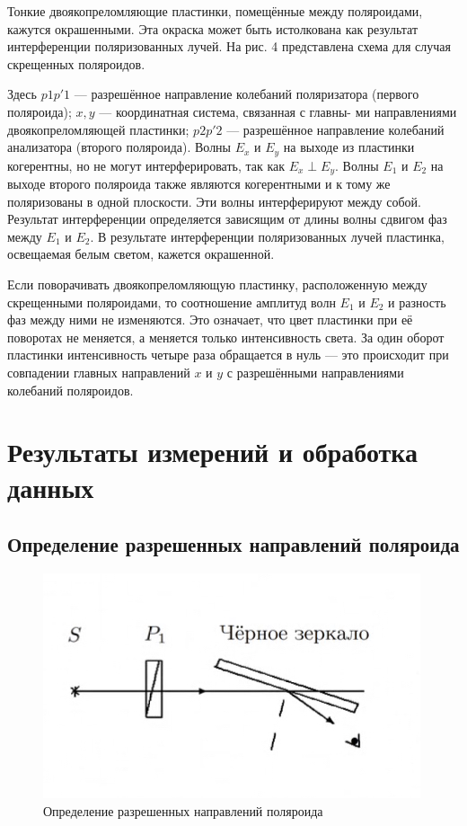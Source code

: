 \documentclass[a4paper,12pt]{article}
\begin{document}
Тонкие двоякопреломляющие пластинки, помещённые между поляроидами, кажутся окрашенными. Эта окраска может быть истолкована как результат интерференции поляризованных лучей. На рис. 4 представлена схема для
случая скрещенных поляроидов.

Здесь $ p1p'1 $ --- разрешённое направление колебаний поляризатора
(первого поляроида); $ x, y $ --- координатная система, связанная с главны-
ми направлениями двоякопреломляющей пластинки; $ p2p'2 $ --- разрешённое направление колебаний анализатора (второго поляроида). Волны
$ E_x  $ и $ E_y $ на выходе из пластинки когерентны, но не могут интерферировать, так как $ E_x \perp  E_y $. Волны $ E_1 $ и $ E_2 $ на выходе второго поляроида
также являются когерентными и к тому же поляризованы в одной плоскости. Эти волны интерферируют между собой. Результат интерференции определяется зависящим от длины волны сдвигом фаз между $ E_1 $
и $ E_2 $. В результате интерференции поляризованных лучей пластинка, освещаемая белым светом, кажется окрашенной.

Если поворачивать двоякопреломляющую пластинку, расположенную между
скрещенными поляроидами, то соотношение амплитуд волн $ E_1 $ и $ E_2 $ и разность фаз между ними не изменяются. Это означает, что цвет пластинки при её поворотах не меняется, а меняется только интенсивность света. За один оборот пластинки интенсивность четыре раза обращается в нуль --- это происходит при совпадении главных направлений
$ x $ и $ y $ с разрешёнными направлениями колебаний поляроидов.


\section{Результаты измерений и обработка данных}

\subsection{Определение разрешенных направлений поляроида}

\begin{figure}
	\includegraphics[width=\linewidth]{5}
	\caption{Определение разрешенных направлений поляроида}
	\label{ris 5}
\end{figure}
\end{document}
